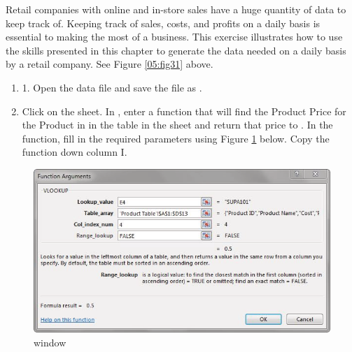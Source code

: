 Retail companies with online and in-store sales have a huge quantity of data to keep track of. Keeping track of sales, costs, and profits on a daily basis is essential to making the most of a business. This exercise illustrates how to use the skills presented in this chapter to generate the data needed on a daily basis by a retail company. See Figure \ref{05:fig31} above.

\begin{enumerate}
	\item 1. Open the data file  and save the file as .
	\item Click on the  sheet. In , enter a  function that will find the Product Price for the Product in  in the table in the  sheet and return that price to . In the  function, fill in the required parameters using Figure \ref{05:fig32} below. Copy the  function down column I.
\end{enumerate}

\begin{figure}[H]
	\centering
	\includegraphics[width=\maxwidth{.95\linewidth}]{gfx/ch05_fig32}
	\caption{ window}
	\label{05:fig32}
\end{figure}

